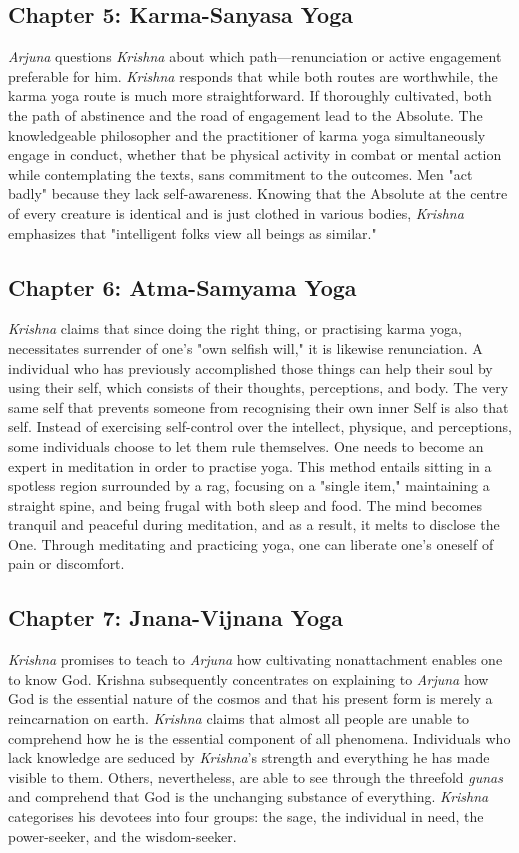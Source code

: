 \documentclass[runningheads]{llncs}
\begin{document}
\subsection{Chapter 5: Karma-Sanyasa Yoga}
\textit{Arjuna} questions \textit{Krishna} about which path—renunciation or active engagement preferable for him. \textit{Krishna} responds that while both routes are worthwhile, the karma yoga route is much more straightforward. If thoroughly cultivated, both the path of abstinence and the road of engagement lead to the Absolute. The knowledgeable philosopher and the practitioner of karma yoga simultaneously engage in conduct, whether that be physical activity in combat or mental action while contemplating the texts, sans commitment to the outcomes. Men "act badly" because they lack self-awareness. Knowing that the Absolute at the centre of every creature is identical and is just clothed in various bodies, \textit{Krishna} emphasizes that "intelligent folks view all beings as similar."
\subsection{Chapter 6: Atma-Samyama Yoga}
\textit{Krishna} claims that since doing the right thing, or practising karma yoga, necessitates surrender of one's "own selfish will," it is likewise renunciation. A individual who has previously accomplished those things can help their soul by using their self, which consists of their thoughts, perceptions, and body. The very same self that prevents someone from recognising their own inner Self is also that self. Instead of exercising self-control over the intellect, physique, and perceptions, some individuals choose to let them rule themselves. One needs to become an expert in meditation in order to practise yoga. This method entails sitting in a spotless region surrounded by a rag, focusing on a "single item," maintaining a straight spine, and being frugal with both sleep and food. The mind becomes tranquil and peaceful during meditation, and as a result, it melts to disclose the One. Through meditating and practicing yoga, one can liberate one's oneself of pain or discomfort.
\subsection{Chapter 7: Jnana-Vijnana Yoga}
\textit{Krishna} promises to teach to \textit{Arjuna} how cultivating nonattachment enables one to know God. Krishna subsequently concentrates on explaining to \textit{Arjuna} how God is the essential nature of the cosmos and that his present form is merely a reincarnation on earth. \textit{Krishna} claims that almost all people are unable to comprehend how he is the essential component of all phenomena. Individuals who lack knowledge are seduced by \textit{Krishna}'s strength and everything he has made visible to them. Others, nevertheless, are able to see through the threefold \textit{gunas }and comprehend that God is the unchanging substance of everything. \textit{Krishna} categorises his devotees into four groups: the sage, the individual in need, the power-seeker, and the wisdom-seeker.
\end{document}

